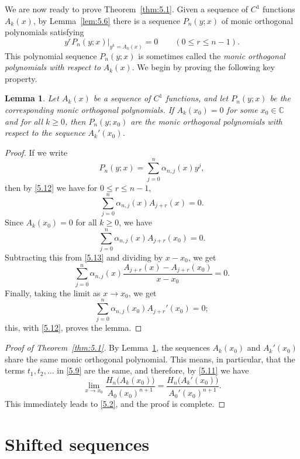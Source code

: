 \documentclass{amsart}
\theoremstyle{plain}
\newtheorem{lemma}[theorem]{Lemma}
\numberwithin{equation}{section}
\begin{document}
We are now ready to prove Theorem~\ref{thm:5.1}. Given a sequence of $C^1$ 
functions $A_k(x)$, by Lemma~\ref{lem:5.6} there is a sequence $P_n(y;x)$ of
monic orthogonal polynomials satisfying
\begin{equation}\label{5.12}
y^rP_n(y;x)\bigg|_{y^k=A_k(x)} = 0\qquad (0\leq r\leq n-1).
\end{equation}
This polynomial sequence $P_n(y;x)$ is sometimes called the
{\it monic orthogonal polynomials with respect to} $A_k(x)$.
We begin by proving the following key property.

\begin{lemma}\label{lem:5.7}
Let $A_k(x)$ be a sequence of $C^1$ functions, and let
$P_n(y;x)$ be the corresponding monic orthogonal polynomials. If $A_k(x_0)=0$
for some $x_0\in{\mathbb C}$ and for all $k\geq 0$, then $P_n(y;x_0)$ are the 
monic orthogonal polynomials with respect to the sequence $A_k'(x_0)$.
\end{lemma}

\begin{proof}
If we write
\[
P_n(y;x) = \sum_{j=0}^n\alpha_{n,j}(x)y^j,
\]
then by \eqref{5.12} we have for $0\leq r\leq n-1$,
\begin{equation}\label{5.13}
\sum_{j=0}^n\alpha_{n,j}(x)A_{j+r}(x) = 0.
\end{equation}
Since $A_k(x_0)=0$ for all $k\geq 0$, we have
\[
\sum_{j=0}^n\alpha_{n,j}(x)A_{j+r}(x_0) = 0.
\]
Subtracting this from \eqref{5.13} and dividing by $x-x_0$, we get
\[
\sum_{j=0}^n\alpha_{n,j}(x)\frac{A_{j+r}(x)-A_{j+r}(x_0)}{x-x_0} = 0.
\]
Finally, taking the limit as $x\to x_0$, we get
\[
\sum_{j=0}^n\alpha_{n,j}(x_0)A_{j+r}'(x_0) = 0;
\]
this, with \eqref{5.12}, proves the lemma.
\end{proof}

\begin{proof}[Proof of Theorem~\ref{thm:5.1}]
By Lemma~\ref{lem:5.7}, the sequences $A_k(x_0)$ and $A_k'(x_0)$ share the same
monic orthogonal polynomial. This means, in particular, that the terms 
$t_1, t_2, \ldots$ in \eqref{5.9} are the same, and therefore, by \eqref{5.11}
we have
\[
\lim_{x\to x_0}\frac{H_n\big(A_k(x_0)\big)}{A_0(x_0)^{n+1}}
=\frac{H_n\big(A_k'(x_0)\big)}{A_0'(x_0)^{n+1}}.
\]
This immediately leads to \eqref{5.2}, and the proof is complete.
\end{proof}

\section{Shifted sequences}
\end{document}
